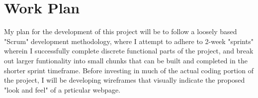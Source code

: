 %
\chapter{Work Plan}
\label{sec:workplan}


My plan for the development of this project will be to follow a loosely based "Scrum" development methodology, where I attempt to adhere to 2-week "sprints" wherein I successfully complete discrete functional parts of the project, and break out larger funtionality into small chunks that can be built and completed in the shorter sprint timeframe.  Before investing in much of the actual coding portion of the project, I will be developing wireframes that visually indicate the proposed "look and feel" of a prticular webpage.

